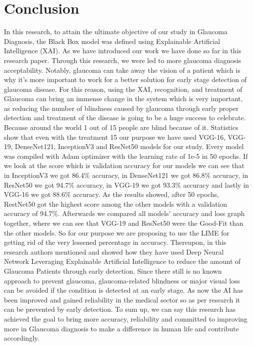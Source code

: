 \section{Conclusion} 
In this research, to attain the ultimate objective of our study in Glaucoma Diagnosis, the Black
Box model was defined using Explainable Artificial Intelligence (XAI). As we have introduced
our work we have done so far in this research paper. Through this research, we were led to more
glaucoma diagnosis acceptability. Notably, glaucoma can take away the vision of a patient which
is why it’s more important to work for a better solution for early stage detection of glaucoma
disease. For this reason, using the XAI, recognition, and treatment of Glaucoma can bring an
immense change in the system which is very important, as reducing the number of blindness
caused by glaucoma through early proper detection and treatment of the disease is going to be a
huge success to celebrate. Because around the world 1 out of 15 people are blind because of it.
Statistics show that even with the treatment 15%
our purpose we have used VGG-16, VGG-19, DenseNet121, InceptionV3 and ResNet50 models
for our study. Every model was compiled with Adam optimizer with the learning rate of 1e-5 in
50 epochs. If we look at the score which is validation accuracy for our models we can see that in
InceptionV3 we got 86.4\% accuracy, in DenseNet121 we got 86.8\% accuracy, in ResNet50 we
got 94.7\% accuracy, in VGG-19 we got 93.3\% accuracy and lastly in VGG-16 we got 88.6\%
accuracy. As the results showed, after 50 epochs, RestNet50 got the highest score among the
other models with a validation accuracy of 94.7\%. Afterwards we compared all models' accuracy
and loss graph together, where we can see that VGG-19 and ResNet50 were the Good-Fit than
the other models. So for our purpose we are proposing to use the LIME for getting rid of the very
lessened percentage in accuracy. Thereupon, in this research authors mentioned and showed how
they have used Deep Neural Network Leveraging Explainable Artificial Intelligence to reduce
the amount of Glaucoma Patients through early detection. Since there still is no known approach
to prevent glaucoma, glaucoma-related blindness or major visual loss can be avoided if the
condition is detected at an early stage. As now the AI has been improved and gained reliability in
the medical sector so as per research it can be prevented by early detection. To sum up, we can
say this research has achieved the goal to bring more accuracy, reliability and committed to
improving more in Glaucoma diagnosis to make a difference in human life and contribute
accordingly.